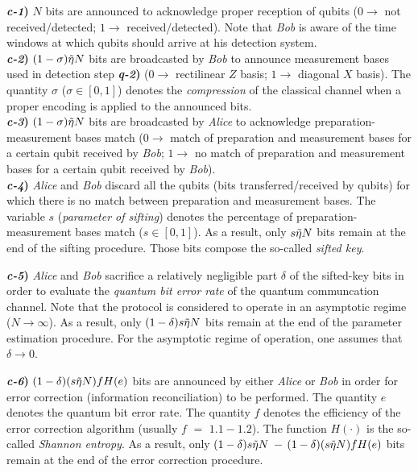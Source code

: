 \documentclass[journal,onecolumn]{IEEEtran}
\theoremstyle{thmstyleone}%
\theoremstyle{thmstyletwo}%
\theoremstyle{thmstylethree}%
\begin{document}
	\begin{tcolorbox}[colback=blue!5,colframe=blue!40!black,title=\textsc{Sifting}]
		\textbf{\textit{c-1})} $N$ bits are announced to acknowledge proper reception of qubits ($0\rightarrow$ not received/detected; $1\rightarrow$ received/detected). Note that \textit{Bob} is aware of the time windows at which qubits should arrive at his detection system. \\
		\textbf{\textit{c-2})} $(1-\sigma)\Tilde{\eta}N$ bits are broadcasted by \textit{Bob} to announce measurement bases used in detection step \textbf{\textit{q-2})} ($0\rightarrow$ rectilinear $Z$ basis; $1\rightarrow$ diagonal $X$ basis). The quantity $\sigma$ ($\sigma\in[0,1]$) denotes the \textit{compression} of the classical channel when a proper encoding is applied to the announced bits.\\
		\textbf{\textit{c-3})} $(1-\sigma)\Tilde{\eta}N$ bits are broadcasted by \textit{Alice} to acknowledge preparation-measurement bases match ($0\rightarrow$ match of preparation and measurement bases for a certain qubit received by \textit{Bob}; $1\rightarrow$ no match of preparation and measurement bases for a certain qubit received by \textit{Bob}).\\
		\textbf{\textit{c-4})} \textit{Alice} and \textit{Bob} discard all the qubits (bits transferred/received by qubits) for which there is no match between preparation and measurement bases. The variable $s$ (\textit{parameter of sifting}) denotes the percentage of preparation-measurement bases match ($s\in[0,1]$). As a result, only $s\Tilde{\eta}N$ bits remain at the end of the sifting procedure. Those bits compose the so-called \textit{sifted key}.
	\end{tcolorbox}
	\begin{tcolorbox}[colback=blue!5,colframe=blue!40!black,title=\textsc{Parameter estimation}]
		\textbf{\textit{c-5})} \textit{Alice} and \textit{Bob} sacrifice a relatively negligible part $\delta$ of the sifted-key bits in order to evaluate the \textit{quantum bit error rate} of the quantum communcation channel. Note that the protocol is considered to operate in an asymptotic regime ($N\rightarrow\infty$). As a result, only $(1-\delta)s\Tilde{\eta}N$ bits remain at the end of the parameter estimation procedure. For the asymptotic regime of operation, one assumes that $\delta\rightarrow 0$.
	\end{tcolorbox}
	\begin{tcolorbox}[colback=blue!5,colframe=blue!40!black,title=\textsc{Error correction}]
		\textbf{\textit{c-6})} $(1-\delta)(s\Tilde{\eta}N)fH(e)$ bits are announced by either \textit{Alice} or \textit{Bob} in order for error correction (information reconciliation) to be performed. The quantity $e$ denotes the quantum bit error rate. The quantity $f$ denotes the efficiency of the error correction algorithm (usually $f$ $=$ $1.1-1.2$). The function $H(\cdot)$ is the so-called \textit{Shannon entropy}. As a result, only $(1-\delta)s\Tilde{\eta}N$ $-$ $(1-\delta)(s\Tilde{\eta}N)fH(e)$ bits remain at the end of the error correction procedure.\\
	\end{tcolorbox}
\end{document}
